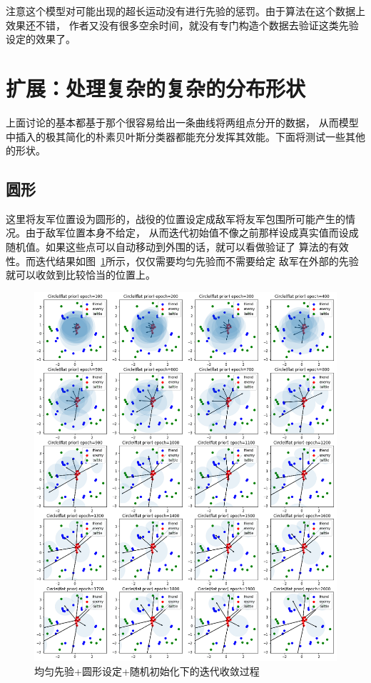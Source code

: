\documentclass{sicnuthesis}
\begin{document}
注意这个模型对可能出现的超长运动没有进行先验的惩罚。由于算法在这个数据上效果还不错，
作者又没有很多空余时间，就没有专门构造个数据去验证这类先验设定的效果了。

\section{扩展：处理复杂的复杂的分布形状}


上面讨论的基本都基于那个很容易给出一条曲线将两组点分开的数据，
从而模型中插入的极其简化的朴素贝叶斯分类器都能充分发挥其效能。下面将测试一些其他的形状。

\subsection{圆形}


这里将友军位置设为圆形的，战役的位置设定成敌军将友军包围所可能产生的情况。由于敌军位置本身不给定，
从而迭代初始值不像之前那样设成真实值而设成随机值。如果这些点可以自动移动到外围的话，就可以看做验证了
算法的有效性。而迭代结果如图~\ref{fig:circleIteration}所示，仅仅需要均匀先验而不需要给定
敌军在外部的先验就可以收敛到比较恰当的位置上。

\begin{figure}[htb]
\includegraphics[width=0.99\linewidth]{circle_iteration.png}
\caption{
均匀先验+圆形设定+随机初始化下的迭代收敛过程}
\label{fig:circleIteration}
\end{figure}
\end{document}

